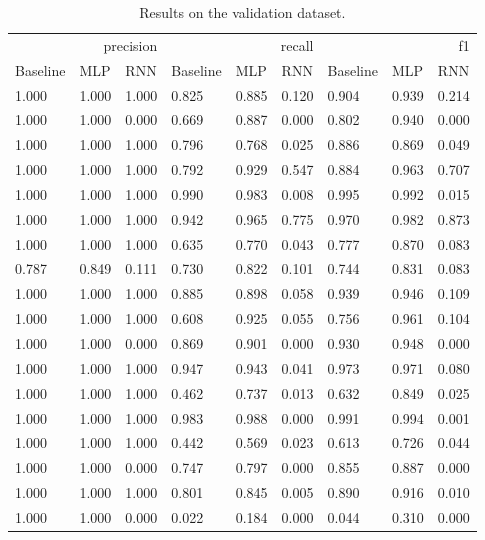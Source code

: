 \begin{table}
\caption{Results on the validation dataset.}
\label{tab::ex_2_valid}
\begin{tabular}{|l||l||l||l||l||l||l||l||l|}
\toprule
\multicolumn{3}{r}{precision} & \multicolumn{3}{r}{recall} & \multicolumn{3}{r}{f1} \\
Baseline & MLP & RNN & Baseline & MLP & RNN & Baseline & MLP & RNN \\
\midrule
1.000 & 1.000 & 1.000 & 0.825 & 0.885 & 0.120 & 0.904 & 0.939 & 0.214 \\
1.000 & 1.000 & 0.000 & 0.669 & 0.887 & 0.000 & 0.802 & 0.940 & 0.000 \\
1.000 & 1.000 & 1.000 & 0.796 & 0.768 & 0.025 & 0.886 & 0.869 & 0.049 \\
1.000 & 1.000 & 1.000 & 0.792 & 0.929 & 0.547 & 0.884 & 0.963 & 0.707 \\
1.000 & 1.000 & 1.000 & 0.990 & 0.983 & 0.008 & 0.995 & 0.992 & 0.015 \\
1.000 & 1.000 & 1.000 & 0.942 & 0.965 & 0.775 & 0.970 & 0.982 & 0.873 \\
1.000 & 1.000 & 1.000 & 0.635 & 0.770 & 0.043 & 0.777 & 0.870 & 0.083 \\
0.787 & 0.849 & 0.111 & 0.730 & 0.822 & 0.101 & 0.744 & 0.831 & 0.083 \\
1.000 & 1.000 & 1.000 & 0.885 & 0.898 & 0.058 & 0.939 & 0.946 & 0.109 \\
1.000 & 1.000 & 1.000 & 0.608 & 0.925 & 0.055 & 0.756 & 0.961 & 0.104 \\
1.000 & 1.000 & 0.000 & 0.869 & 0.901 & 0.000 & 0.930 & 0.948 & 0.000 \\
1.000 & 1.000 & 1.000 & 0.947 & 0.943 & 0.041 & 0.973 & 0.971 & 0.080 \\
1.000 & 1.000 & 1.000 & 0.462 & 0.737 & 0.013 & 0.632 & 0.849 & 0.025 \\
1.000 & 1.000 & 1.000 & 0.983 & 0.988 & 0.000 & 0.991 & 0.994 & 0.001 \\
1.000 & 1.000 & 1.000 & 0.442 & 0.569 & 0.023 & 0.613 & 0.726 & 0.044 \\
1.000 & 1.000 & 0.000 & 0.747 & 0.797 & 0.000 & 0.855 & 0.887 & 0.000 \\
1.000 & 1.000 & 1.000 & 0.801 & 0.845 & 0.005 & 0.890 & 0.916 & 0.010 \\
1.000 & 1.000 & 0.000 & 0.022 & 0.184 & 0.000 & 0.044 & 0.310 & 0.000 \\
\bottomrule
\end{tabular}
\end{table}
